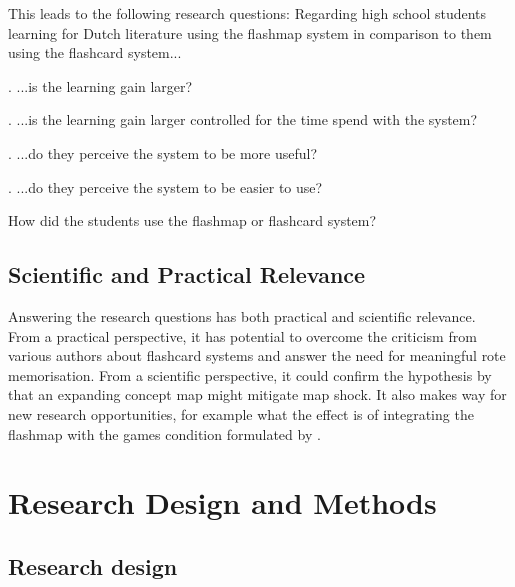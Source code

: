 \documentclass[11pt,twoside]{report} %
\begin{document}
This leads to the following research questions: Regarding high school students learning for Dutch literature using the flashmap system in comparison to them using the flashcard system...

\label{benefit}
\label{effectiveness}
. ...is the learning gain larger?

\label{efficiency}
. ...is the learning gain larger controlled for the time spend with the system?

\label{perception}
\label{usefulness}
. ...do they perceive the system to be more useful?

\label{ease}
. ...do they perceive the system to be easier to use?

\label{howused}
 How did the students use the flashmap or flashcard system?

\section{Scientific and Practical Relevance}

Answering the research questions has both practical and scientific relevance. From a practical perspective, it has potential to overcome the criticism from various authors about flashcard systems and answer the need for meaningful rote memorisation. From a scientific perspective, it could confirm the hypothesis by  that an expanding concept map might mitigate map shock. It also makes way for new research opportunities, for example what the effect is of integrating the flashmap with the games condition formulated by . 


\chapter{Research Design and Methods}

\section{Research design}
\end{document}
